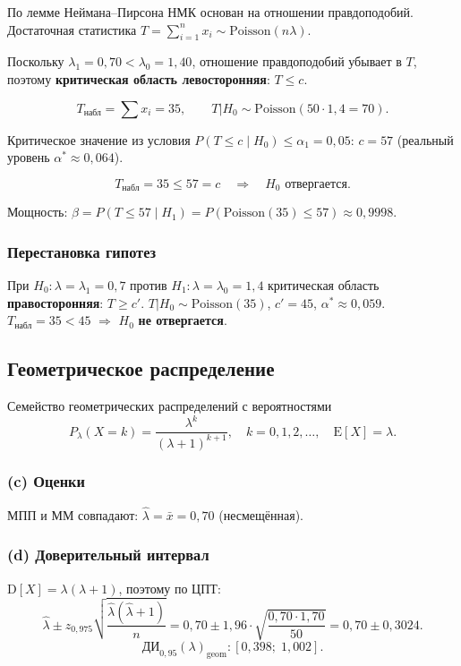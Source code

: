 \documentclass[12pt,a4paper]{article}
\newcommand{\lahat}{\hat{\lambda}}
\newcommand{\xbar}{\bar{x}}
\begin{document}
	По лемме Неймана--Пирсона НМК основан на отношении правдоподобий.
	Достаточная статистика $T = \sum_{i=1}^n x_i \sim \mathrm{Poisson}(n\lambda)$.
	
	Поскольку $\lambda_1 = 0{,}70 < \lambda_0 = 1{,}40$, отношение правдоподобий убывает в $T$,
	поэтому \textbf{критическая область левосторонняя}: $T \le c$.
	
	\[
	T_{\text{набл}} = \sum x_i = 35, \qquad T|H_0 \sim \mathrm{Poisson}(50 \cdot 1{,}4 = 70).
	\]
	
	Критическое значение из условия $P(T \le c \mid H_0) \le \alpha_1 = 0{,}05$:
	$c = 57$ (реальный уровень $\alpha^* \approx 0{,}064$).
	
	\[
	T_{\text{набл}} = 35 \le 57 = c \quad\Rightarrow\quad \textbf{$H_0$ отвергается}.
	\]
	
	Мощность: $\beta = P(T \le 57 \mid H_1) = P(\mathrm{Poisson}(35) \le 57) \approx 0{,}9998$.
	
	\subsubsection*{Перестановка гипотез}
	При $H_0\colon\lambda=\lambda_1=0{,}7$ против $H_1\colon\lambda=\lambda_0=1{,}4$
	критическая область \textbf{правосторонняя}: $T \ge c'$.
	$T|H_0 \sim \mathrm{Poisson}(35)$, $c' = 45$, $\alpha^* \approx 0{,}059$.
	$T_{\text{набл}} = 35 < 45$ $\Rightarrow$ $H_0$ \textbf{не отвергается}.
	
	\subsection{Геометрическое распределение}
	
	Семейство геометрических распределений с вероятностями
	\[
	P_\lambda(X = k) = \frac{\lambda^k}{(\lambda+1)^{k+1}}, \quad k = 0,1,2,\ldots,
	\quad \mathrm{E}[X] = \lambda.
	\]
	
	\subsubsection*{(c) Оценки}
	МПП и ММ совпадают: $\lahat = \xbar = 0{,}70$ (несмещённая).
	
	\subsubsection*{(d) Доверительный интервал}
	$\mathrm{D}[X] = \lambda(\lambda+1)$, поэтому по ЦПТ:
	\[
	\lahat \pm z_{0{,}975}\sqrt{\frac{\lahat(\lahat+1)}{n}}
	= 0{,}70 \pm 1{,}96 \cdot \sqrt{\frac{0{,}70 \cdot 1{,}70}{50}}
	= 0{,}70 \pm 0{,}3024.
	\]
	\[
	\boxed{\mathrm{ДИ}_{0{,}95}(\lambda)_{\mathrm{geom}}: [0{,}398;\; 1{,}002].}
	\]
	
\end{document}
